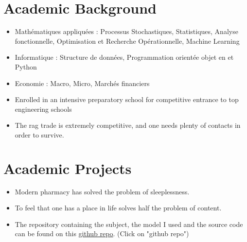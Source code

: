 \documentclass[a4paper,
		varspacetitle=-2mm, %
		varspacesection=2.5mm, %
		vartopmargin=0.8cm,  %
		varbottommargin=0.5cm %
	]{cv}
\begin{document}
\vspace{2mm}


\section{Academic Background}
\vspace{2mm}
\begin{itemize}[noitemsep,topsep=0pt,leftmargin=0.21\textwidth]
\item Mathématiques appliquées : Processus Stochastiques, Statistiques, Analyse fonctionnelle, Optimisation et Recherche Opérationnelle, Machine Learning
\item Informatique : Structure de données, Programmation orientée objet en  et Python
\item Economie : Macro, Micro, Marchés financiers
\end{itemize}
\vspace{2mm}

\begin{itemize}[noitemsep,topsep=0pt,leftmargin=0.21\textwidth]
\item Enrolled in an intensive preparatory school for competitive entrance to top engineering schools
\item The rag trade is extremely competitive, and one needs plenty of contacts in order to survive.
\end{itemize}
\vspace{2mm}

\section{Academic Projects}
\begin{itemize}[noitemsep,topsep=0pt,leftmargin=0.21\textwidth]
\item Modern pharmacy has solved the problem of sleeplessness.
\item To feel that one has a place in life solves half the problem of content.
\item The repository containing the subject, the model I used and the source code can be found on this {\href{https://github.com/NikitaPomies/FPL_AIRLIQUIDE}{{\underline{github repo}}}}. (Click on "github repo")
\end{itemize}
\end{document}
